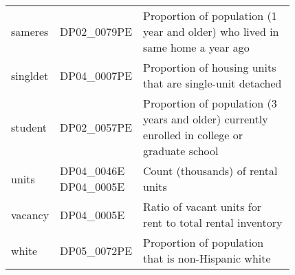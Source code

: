 \begin{tabular}{l p{0.15\linewidth} p{0.675\linewidth}}
sameres  & DP02\_0079PE & Proportion of population (1 year and older) who lived in same home a year ago\\
singldet & DP04\_0007PE & Proportion of housing units that are single-unit detached\\
student  & DP02\_0057PE & Proportion of population (3 years and older) currently enrolled in college or graduate school\\
units    & DP04\_0046E DP04\_0005E & Count (thousands) of rental units\\
vacancy  & DP04\_0005E  & Ratio of vacant units for rent to total rental inventory\\
white    & DP05\_0072PE & Proportion of population that is non-Hispanic white\\
\bottomrule
\end{tabular}
